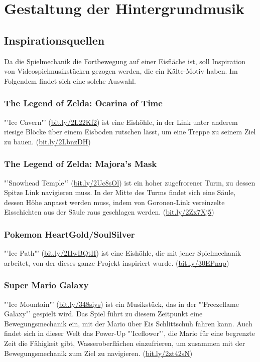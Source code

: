 \documentclass[a4paper,10pt,ngerman]{scrartcl}
\begin{document}
	
	\newpage
	\section{Gestaltung der Hintergrundmusik}
	
		\subsection{Inspirationsquellen}
		
			Da die Spielmechanik die Fortbewegung auf einer Eisfläche ist, soll Inspiration von Videospielmusikstücken gezogen werden, die ein Kälte-Motiv haben. Im Folgendem findet sich eine solche Auswahl.
			
			\subsubsection{The Legend of Zelda: Ocarina of Time}
			
				"'Ice Cavern"' (\href{https://youtube.com/watch?v=bcXuwXKsqMY}{bit.ly/2L22Kf2}) ist eine Eishöhle, in der Link unter anderem riesige Blöcke über einem Eisboden rutschen lässt, um eine Treppe zu seinem Ziel zu bauen. (\href{https://youtube.com/watch?v=uaGb3PtSPDg}{bit.ly/2LbnzDH})
			
			
			\subsubsection{The Legend of Zelda: Majora's Mask}
			
				"'Snowhead Temple"' (\href{https://youtube.com/watch?v=uxPDVDpbskI}{bit.ly/2Uc8sOl}) ist ein hoher zugefrorener Turm, zu dessen Spitze Link navigieren muss. In der Mitte des Turms findet sich eine Säule, dessen Höhe anpasst werden muss, indem von Goronen-Link vereinzelte Eisschichten aus der Säule raus geschlagen werden. (\href{https://youtube.com/watch?v=yM8440G32gk}{bit.ly/2Zx7Xj5})
			
			
			\subsubsection{Pokemon HeartGold/SoulSilver}
			
				"'Ice Path"' (\href{https://youtube.com/watch?v=riClBdyycM4}{bit.ly/2HwBQtH}) ist eine Eishöhle, die mit jener Spielmechanik arbeitet, von der dieses ganze Projekt inspiriert wurde. (\href{https://youtube.com/watch?v=erqrS-e-piA}{bit.ly/30EPnqp})
	
	
			\subsubsection{Super Mario Galaxy}
			
			"'Ice Mountain"' (\href{https://youtube.com/watch?v=9qnJWbEnKOs}{bit.ly/348siys}) ist ein Musikstück, das in der "'Freezeflame Galaxy"' gespielt wird. Das Spiel führt zu diesem Zeitpunkt eine Bewegungsmechanik ein, mit der Mario über Eis Schlittschuh fahren kann. Auch findet sich in dieser Welt das Power-Up "'Iceflower"', die Mario für eine begrenzte Zeit die Fähigkeit gibt, Wasseroberflächen einzufrieren, um zusammen mit der Bewegungsmechanik zum Ziel zu navigieren. (\href{https://youtube.com/watch?v=ImsaYCFMJns}{bit.ly/2zt42sN})
		
\end{document}
